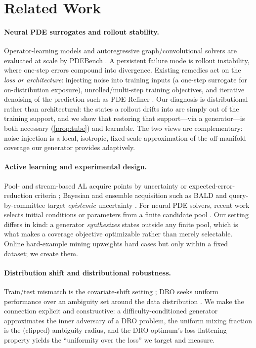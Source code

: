 \documentclass{article}
\theoremstyle{plain}
\theoremstyle{definition}
\theoremstyle{remark}
\begin{document}
\section{Related Work}\label{sec:related}
\paragraph{Neural PDE surrogates and rollout stability.}
Operator-learning models \citep{li2021fno,lu2021deeponet} and autoregressive graph/convolutional solvers
\citep{brandstetter2022mppde} are evaluated at scale by PDEBench \citep{takamoto2022pdebench}. A
persistent failure mode is rollout instability, where one-step errors compound into divergence. Existing
remedies act on the \emph{loss or architecture}: injecting noise into training inputs (a one-step
surrogate for on-distribution exposure), unrolled/multi-step training objectives, and iterative
denoising of the prediction such as PDE-Refiner \citep{lippe2023pderefiner}. Our diagnosis is
distributional rather than architectural: the states a rollout drifts into are simply out of the training
support, and we show that restoring that support---via a generator---is both necessary (\cref{prop:tube})
and learnable. The two views are complementary: noise injection is a local, isotropic, fixed-scale
approximation of the off-manifold coverage our generator provides adaptively.

\paragraph{Active learning and experimental design.}
Pool- and stream-based AL acquire points by uncertainty or expected-error-reduction criteria
\citep{settles2009active}; Bayesian and ensemble acquisition such as BALD and query-by-committee target
\emph{epistemic} uncertainty \citep{houlsby2011bald,gal2017dbal,beluch2018ensembles}. For neural PDE
solvers, recent work selects initial conditions or parameters from a finite candidate pool
\citep{musekamp2024al4pde}. Our setting differs in kind: a generator \emph{synthesizes} states outside
any finite pool, which is what makes a coverage objective optimizable rather than merely selectable.
Online hard-example mining \citep{shrivastava2016ohem} upweights hard cases but only within a fixed
dataset; we create them.

\paragraph{Distribution shift and distributional robustness.}
Train/test mismatch is the covariate-shift setting \citep{shimodaira2000covariate}; DRO seeks uniform
performance over an ambiguity set around the data distribution
\citep{benTal2013dro,duchi2021dro,sagawa2020groupdro}. We make the connection explicit and
constructive: a difficulty-conditioned generator approximates the inner adversary of a DRO problem, the
uniform mixing fraction is the (clipped) ambiguity radius, and the DRO optimum's loss-flattening property
yields the ``uniformity over the loss'' we target and measure.
\end{document}
